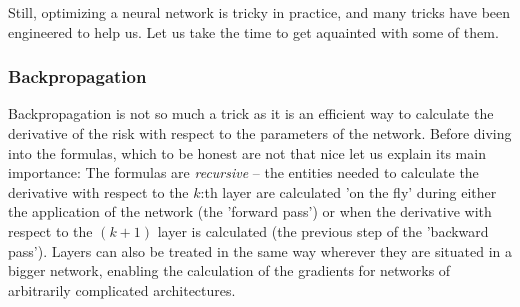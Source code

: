 \documentclass{article}
\begin{document}
Still, optimizing a neural network is tricky in practice, and many tricks have been engineered to help us. Let us take the time to get aquainted with some of them.

\subsubsection{Backpropagation}
Backpropagation is not so much a trick as it is an efficient way to calculate the derivative of the risk with respect to the parameters of the network. Before diving into the formulas, which to be honest are not that nice let us explain its main importance: The formulas are \emph{recursive} -- the entities needed to calculate the derivative with respect to the $k$:th layer are calculated 'on the fly' during either the application of the network (the 'forward pass') or when the derivative with respect to the $(k+1)$ layer is calculated (the previous step of the 'backward pass'). Layers can also be treated in the same way wherever they are situated in a bigger network, enabling the calculation of the gradients for networks of arbitrarily complicated architectures.
\end{document}

